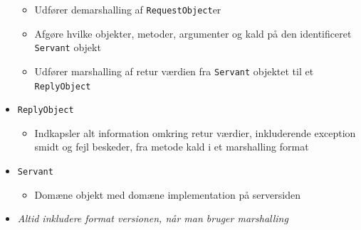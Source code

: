 \documentclass[a4, english]{article}
\begin{document}
\begin{itemize}
\begin{itemize}
  	\item Udfører demarshalling af \texttt{RequestObject}er
    \item Afgøre hvilke objekter, metoder, argumenter og kald på den identificeret \texttt{Servant} objekt 
    \item Udfører marshalling af retur værdien fra \texttt{Servant} objektet til et \texttt{ReplyObject}
  \end{itemize}
  \item \texttt{ReplyObject}
  \begin{itemize}
    \item Indkapsler alt information omkring retur værdier, inkluderende exception smidt og fejl 
beskeder, fra metode kald i et marshalling format 
  \end{itemize}
  \item \texttt{Servant}
  \begin{itemize}
  	\item Domæne objekt med domæne implementation på serversiden
  \end{itemize}
  \item \textit{Altid inkludere format versionen, når man bruger marshalling}
\end{itemize}
\end{document}
